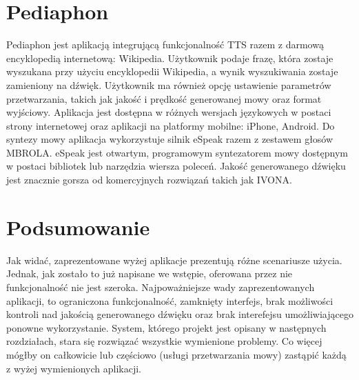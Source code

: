 \section {Pediaphon} 

Pediaphon\cite{pediaphon} jest aplikacją integrującą funkcjonalność TTS razem z darmową encyklopedią internetową: Wikipedia. Użytkownik podaje frazę, która zostaje wyszukana przy użyciu encyklopedii Wikipedia, a wynik wyszukiwania zostaje zamieniony na dźwięk. Użytkownik ma również opcję ustawienie parametrów przetwarzania, takich jak jakość i prędkość generowanej mowy oraz format wyjściowy. Aplikacja jest dostępna w różnych wersjach językowych w postaci strony internetowej oraz aplikacji na platformy mobilne: iPhone, Android. Do syntezy mowy aplikacja wykorzystuje silnik eSpeak razem z zestawem głosów MBROLA. eSpeak jest otwartym, programowym syntezatorem mowy dostępnym w postaci bibliotek lub narzędzia wiersza poleceń. Jakość generowanego dźwięku jest znacznie gorsza od komercyjnych rozwiązań takich jak IVONA.

\section*{Podsumowanie} 
Jak widać, zaprezentowane wyżej aplikacje prezentują różne scenariusze użycia. Jednak, jak zostało to już napisane we wstępie, oferowana przez nie funkcjonalność nie jest szeroka. Najpoważniejsze wady zaprezentowanych aplikacji, to ograniczona funkcjonalność, zamknięty interfejs, brak możliwości kontroli nad jakością generowanego dźwięku oraz brak interefejsu umożliwiającego ponowne wykorzystanie. System, którego projekt jest opisany w następnych rozdziałach, stara się  rozwiązać wszystkie wymienione problemy. Co więcej mógłby on całkowicie lub częściowo (usługi przetwarzania mowy) zastąpić każdą z wyżej wymienionych aplikacji. 





